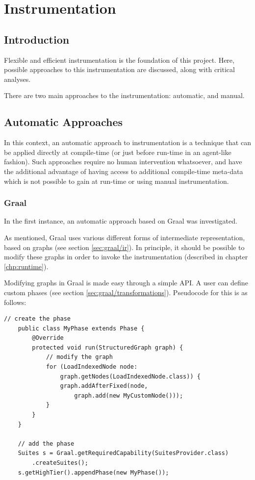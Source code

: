 \chapter{Instrumentation} \label{chp:instrumentation}
\section{Introduction} \label{sec:instrumentation/introduction}
Flexible and efficient instrumentation is the foundation of this project. Here, possible approaches to this instrumentation are discussed, along with critical analyses.

There are two main approaches to the instrumentation: automatic, and manual. 

\section{Automatic Approaches} \label{sec:instrumentation/automatic}
	In this context, an automatic approach to instrumentation is a technique that can be applied directly at compile-time (or just before run-time in an agent-like fashion). Such approaches require no human intervention whatsoever, and have the additional advantage of having access to additional compile-time meta-data which is not possible to gain at run-time or using manual instrumentation.

	\subsection{Graal} \label{sec:instrumentation/graal}
	In the first instance, an automatic approach based on Graal was investigated.
	
	As mentioned, Graal uses various different forms of intermediate representation, based on graphs (see section \ref{sec:graal/ir}). In principle, it should be possible to modify these graphs in order to invoke the instrumentation (described in chapter \ref{chp:runtime}).
	
	Modifying graphs in Graal is made easy through a simple API. A user can define custom phases (see section \ref{sec:graal/transformations}). Pseudocode for this is as follows:
	
	\newpage
	
	\begin{lstlisting}[caption=Sample code for adding a phase and manipulating a graph,label=list:graph-trans]
	// create the phase
	public class MyPhase extends Phase {
	    @Override
	    protected void run(StructuredGraph graph) {
	        // modify the graph
	        for (LoadIndexedNode node:
	            graph.getNodes(LoadIndexedNode.class)) {
	            graph.addAfterFixed(node,
	                graph.add(new MyCustomNode()));
	        }
	    }
	}
	
	// add the phase
	Suites s = Graal.getRequiredCapability(SuitesProvider.class)
	    .createSuites();
	s.getHighTier().appendPhase(new MyPhase());
	\end{lstlisting}
	
